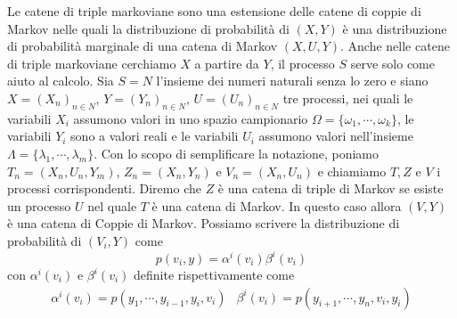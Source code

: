 Le catene di triple markoviane sono una estensione delle catene di coppie di Markov nelle quali la distribuzione di probabilit\`a di $(X,Y)$ \`e una distribuzione di probabilit\`a marginale di una catena di Markov $(X,U,Y)$.
Anche nelle catene di triple markoviane cerchiamo $X$ a partire da $Y$, il processo $S$ serve solo come aiuto al calcolo. 
Sia $S=N$ l'insieme dei numeri naturali senza lo zero e siano $X=(X_{n})_{n\in N}$, $Y=(Y_{n})_{n\in N}$, $U=(U_{n})_{n\in N}$ tre processi, nei quali le variabili $X_{i}$ assumono valori in uno spazio campionario $\Omega=\{\omega_{1}, \cdots, \omega_{k}\}$, le variabili $Y_{i}$ sono a valori reali e le variabili $U_{i}$ assumono  
valori nell'insieme $\Lambda = \{\lambda_{1}, \cdots, \lambda_{m}\}$.
Con lo scopo di semplificare la notazione, poniamo $T_{n}=(X_{n}, U_{n}, Y_{m})$, $Z_{n}=(X_{n}, Y_{n})$ e $V_{n}=(X_{n}, U_{n})$ e chiamiamo $T,Z$ e $V$ i processi corrispondenti.
Diremo che $Z$ \`e una catena di triple di Markov se esiste un processo $U$ nel quale $T$ \`e una catena di Markov.
In questo caso allora $(V,Y)$ \`e una catena di Coppie di Markov. Possiamo scrivere la distribuzione di probabilit\`a di $(V_{i}, Y)$ come 
\[
  p(v_{i}, y)=\alpha^{i}(v_{i}) \beta^{i}(v_{i})
\]
con $\alpha^{i}(v_{i})$ e $\beta^{i}(v_{i})$ definite rispettivamente come 
\[
  \begin{array}{ll}
      \alpha^{i}(v_{i})=p(y_{1}, \cdots, y_{i-1}, y_{i}, v_{i})
    &
      \beta^{i}(v_{i})=p(y_{i+1}, \cdots, y_{n}, v_{i}, y_{i})
  \end{array}
\]


